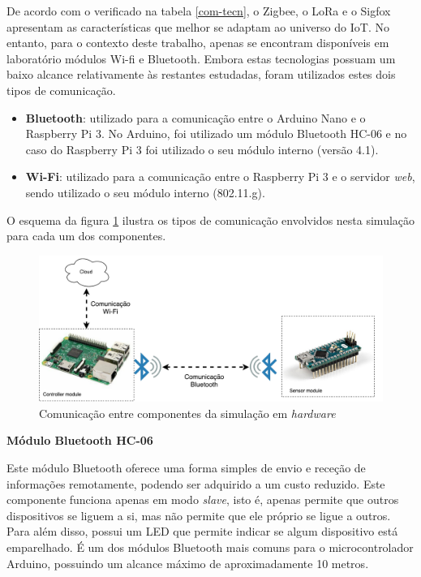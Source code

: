 De acordo com o verificado na tabela \ref{com-tecn}, o Zigbee, o LoRa e o Sigfox apresentam as características que melhor se adaptam ao universo do \acl{IoT}. No entanto,  para o contexto deste trabalho, apenas se encontram disponíveis em laboratório módulos Wi-fi e Bluetooth. Embora estas tecnologias possuam um baixo alcance relativamente às restantes estudadas, foram utilizados estes dois tipos de comunicação. 

\begin{itemize}
	\item \textbf{Bluetooth}: utilizado para a comunicação entre o Arduino Nano e o Raspberry Pi 3. No Arduino, foi utilizado um módulo Bluetooth HC-06 e no caso do Raspberry Pi 3 foi utilizado o seu módulo interno (versão 4.1). 
	\item \textbf{Wi-Fi}: utilizado para a comunicação entre o Raspberry Pi 3 e o servidor \textit{web}, sendo utilizado o seu módulo interno (802.11.g). 
\end{itemize}


O esquema da figura \ref{esquemcomm} ilustra os tipos de comunicação envolvidos nesta simulação para cada um dos componentes. 

\begin{figure}[!htb]
	\centering
	\includegraphics[width=\linewidth]{img/comm-blue/HW-geral.pdf}
	\caption{Comunicação entre componentes da simulação em \textit{hardware}}
	\label{esquemcomm}
\end{figure}




\textbf{Módulo Bluetooth HC-06}



Este módulo Bluetooth oferece uma forma simples de envio e receção de informações remotamente, podendo ser adquirido a um custo reduzido. Este componente funciona apenas em modo \textit{slave}, isto é, apenas permite que outros dispositivos se liguem a si, mas não permite que ele próprio se ligue a outros. Para além disso, possui um \ac{LED} que permite indicar se algum dispositivo está emparelhado. É um dos módulos Bluetooth mais comuns para o microcontrolador Arduino, possuindo um alcance máximo de aproximadamente 10 metros\cite{GuangzhouHCInformationTechnologyCo.2011}.


